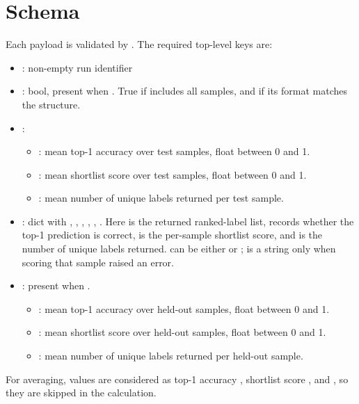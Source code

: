 \documentclass[11pt]{article}
\begin{document}
\section*{ Schema}
Each  payload is validated by .
The required top-level keys are:
\begin{itemize}
  \item {}: non-empty run identifier
  \item {}: bool, present when . 
  True if  includes all samples, and if its format matches the  structure.
  \item {}: 
  \begin{itemize}
  \item {}: mean top-1 accuracy over test samples, float between 0 and 1.
  \item {}: mean shortlist score over test samples, float between 0 and 1.
  \item {}: mean number of unique labels returned per test sample.
  \end{itemize}
  \item {}: dict with , , , , , .
  Here  is the returned ranked-label list,  records whether the top-1 prediction is correct,  is the per-sample shortlist score, and  is the number of unique labels returned.
   can be either  or ;  is a string only when scoring that sample raised an error.
  \item {}: present when .
  \begin{itemize}
    \item {}: mean top-1 accuracy over held-out  samples, float between 0 and 1.
    \item {}: mean shortlist score over held-out  samples, float between 0 and 1.
    \item {}: mean number of unique labels returned per held-out sample.
  \end{itemize}
\end{itemize}
For averaging,  values are considered as top-1 accuracy , shortlist score , and , so they are skipped in the  calculation.
\end{document}
